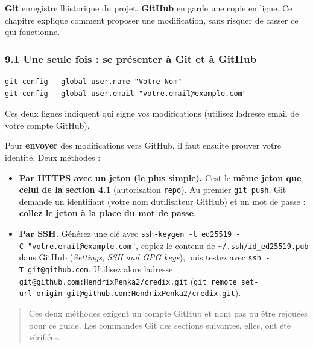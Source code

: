 \documentclass[
  french,
  11pt,
  a4paper,
]{article}
\providecommand{\tightlist}{%
  \setlength{\itemsep}{0pt}\setlength{\parskip}{0pt}}
\begin{document}
\textbf{Git} enregistre l\textquotesingle historique du projet.
\textbf{GitHub} en garde une copie en ligne. Ce chapitre explique
comment proposer une modification, sans risquer de casser ce qui
fonctionne.

\subsubsection{9.1 Une seule fois : se présenter à Git et à
GitHub}\label{91-une-seule-fois--se-pruxe9senter-uxe0-git-et-uxe0-github}

\begin{Verbatim}[breaklines=true,breakanywhere=true,fontsize=\small,frame=leftline,framerule=1.6pt,rulecolor=\color{credixblue},framesep=3mm,xleftmargin=2mm,xrightmargin=1mm]
git config --global user.name "Votre Nom"
git config --global user.email "votre.email@example.com"
\end{Verbatim}

Ces deux lignes indiquent qui signe vos modifications (utilisez
l\textquotesingle adresse email de votre compte GitHub).

Pour \textbf{envoyer} des modifications vers GitHub, il faut ensuite
prouver votre identité. Deux méthodes :

\begin{itemize}
\tightlist
\item
  \textbf{Par HTTPS avec un jeton (le plus simple).}
  C\textquotesingle est le \textbf{même jeton que celui de la section
  4.1} (autorisation \texttt{repo}). Au premier \texttt{git\ push}, Git
  demande un identifiant (votre nom d\textquotesingle utilisateur
  GitHub) et un mot de passe : \textbf{collez le jeton à la place du mot
  de passe}.
\item
  \textbf{Par SSH.} Générez une clé avec
  \texttt{ssh-\allowbreak{}keygen\ -\allowbreak{}t\ ed25519\ -\allowbreak{}C\ "votre.\allowbreak{}email@example.\allowbreak{}com"},
  copiez le contenu de \texttt{\textasciitilde{}/.ssh/id\_ed25519.pub}
  dans GitHub (\emph{Settings}, \emph{SSH and GPG keys}), puis testez
  avec \texttt{ssh\ -\allowbreak{}T\ git@github.\allowbreak{}com}.
  Utilisez alors l\textquotesingle adresse
  \texttt{git@github.\allowbreak{}com:HendrixPenka2/\allowbreak{}credix.\allowbreak{}git}
  (\texttt{git\ remote\ set-\allowbreak{}url\ origin\ git@github.\allowbreak{}com:HendrixPenka2/\allowbreak{}credix.\allowbreak{}git}).
\end{itemize}

\begin{quote}
Ces deux méthodes exigent un compte GitHub et n\textquotesingle ont pas
pu être rejouées pour ce guide. Les commandes Git des sections
suivantes, elles, ont été vérifiées.
\end{quote}
\end{document}
